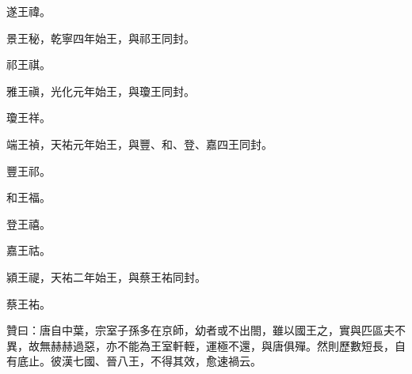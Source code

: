 \begin{pinyinscope}
 遂王禕。



 景王秘，乾寧四年始王，與祁王同封。



 祁王祺。



 雅王禛，光化元年始王，與瓊王同封。



 瓊王祥。



 端王禎，天祐元年始王，與豐、和、登、嘉四王同封。



 豐王祁。



 和王福。



 登王禧。



 嘉王祜。



 潁王禔，天祐二年始王，與蔡王祐同封。



 蔡王祐。



 贊曰：唐自中葉，宗室子孫多在京師，幼者或不出閤，雖以國王之，實與匹區夫不異，故無赫赫過惡，亦不能為王室軒輊，運極不還，與唐俱殫。然則歷數短長，自有底止。彼漢七國、晉八王，不得其效，愈速禍云。



\end{pinyinscope}